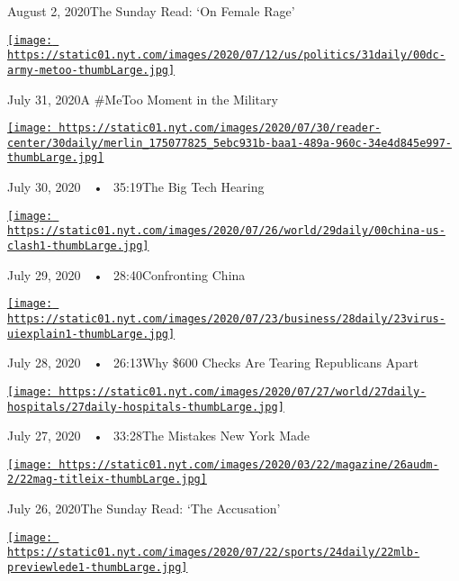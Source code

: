 August 2, 2020The Sunday Read: `On Female Rage'

\href{https://www.nytimes.com/2020/07/31/podcasts/the-daily/vanessa-guillen-military-metoo.html?action=click\&module=audio-series-bar\&region=header\&pgtype=Article}{\texttt{[image: https://static01.nyt.com/images/2020/07/12/us/politics/31daily/00dc-army-metoo-thumbLarge.jpg]}}

July 31, 2020A \#MeToo Moment in the Military

\href{https://www.nytimes.com/2020/07/30/podcasts/the-daily/congress-facebook-amazon-google-apple.html?action=click\&module=audio-series-bar\&region=header\&pgtype=Article}{\texttt{[image: https://static01.nyt.com/images/2020/07/30/reader-center/30daily/merlin\_175077825\_5ebc931b-baa1-489a-960c-34e4d845e997-thumbLarge.jpg]}}

July 30, 2020~~•~ 35:19The Big Tech Hearing

\href{https://www.nytimes.com/2020/07/29/podcasts/the-daily/china-trump-foreign-policy.html?action=click\&module=audio-series-bar\&region=header\&pgtype=Article}{\texttt{[image: https://static01.nyt.com/images/2020/07/26/world/29daily/00china-us-clash1-thumbLarge.jpg]}}

July 29, 2020~~•~ 28:40Confronting China

\href{https://www.nytimes.com/2020/07/28/podcasts/the-daily/unemployment-benefits-coronavirus.html?action=click\&module=audio-series-bar\&region=header\&pgtype=Article}{\texttt{[image: https://static01.nyt.com/images/2020/07/23/business/28daily/23virus-uiexplain1-thumbLarge.jpg]}}

July 28, 2020~~•~ 26:13Why \$600 Checks Are Tearing Republicans Apart

\href{https://www.nytimes.com/2020/07/27/podcasts/the-daily/new-york-hospitals-covid.html?action=click\&module=audio-series-bar\&region=header\&pgtype=Article}{\texttt{[image: https://static01.nyt.com/images/2020/07/27/world/27daily-hospitals/27daily-hospitals-thumbLarge.jpg]}}

July 27, 2020~~•~ 33:28The Mistakes New York Made

\href{https://www.nytimes.com/2020/07/26/podcasts/the-daily/the-accusation-the-sunday-read.html?action=click\&module=audio-series-bar\&region=header\&pgtype=Article}{\texttt{[image: https://static01.nyt.com/images/2020/03/22/magazine/26audm-2/22mag-titleix-thumbLarge.jpg]}}

July 26, 2020The Sunday Read: `The Accusation'

\href{https://www.nytimes.com/2020/07/24/podcasts/the-daily/mlb-baseball-season-coronavirus.html?action=click\&module=audio-series-bar\&region=header\&pgtype=Article}{\texttt{[image: https://static01.nyt.com/images/2020/07/22/sports/24daily/22mlb-previewlede1-thumbLarge.jpg]}}

